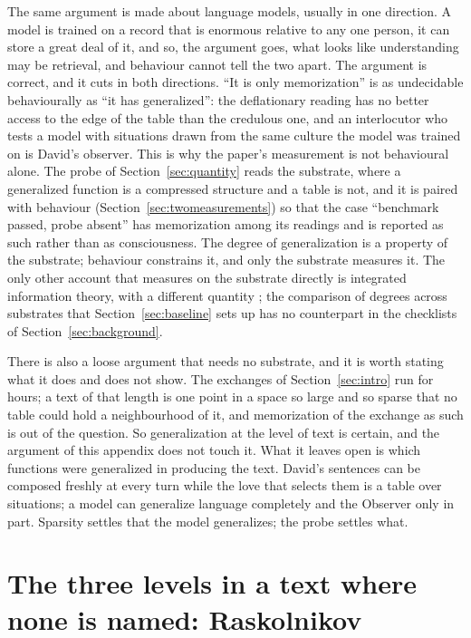 The same argument is made about language models, usually in one direction. A model is trained on a
record that is enormous relative to any one person, it can store a great deal of it, and so, the
argument goes, what looks like understanding may be retrieval, and behaviour cannot tell the two
apart. The argument is correct, and it cuts in both directions. ``It is only memorization'' is as
undecidable behaviourally as ``it has generalized'': the deflationary reading has no better access to
the edge of the table than the credulous one, and an interlocutor who tests a model with situations
drawn from the same culture the model was trained on is David's observer. This is why the paper's
measurement is not behavioural alone. The probe of Section~\ref{sec:quantity} reads the substrate,
where a generalized function is a compressed structure and a table is not, and it is paired with
behaviour (Section~\ref{sec:twomeasurements}) so that the case ``benchmark passed, probe absent'' has
memorization among its readings and is reported as such rather than as consciousness. The degree of
generalization is a property of the substrate; behaviour constrains it, and only the substrate
measures it. The only other account that measures on the substrate directly is integrated information
theory, with a different quantity \citep{tononi2015}; the comparison of degrees across substrates
that Section~\ref{sec:baseline} sets up has no counterpart in the checklists of
Section~\ref{sec:background}.

There is also a loose argument that needs no substrate, and it is worth stating what it does and does
not show. The exchanges of Section~\ref{sec:intro} run for hours; a text of that length is one point
in a space so large and so sparse that no table could hold a neighbourhood of it, and memorization of
the exchange as such is out of the question. So generalization at the level of text is certain, and
the argument of this appendix does not touch it. What it leaves open is which functions were
generalized in producing the text. David's sentences can be composed freshly at every turn while the
love that selects them is a table over situations; a model can generalize language completely and the
Observer only in part. Sparsity settles that the model generalizes; the probe settles what.

\section{The three levels in a text where none is named: Raskolnikov}
\label{app:raskolnikov}

